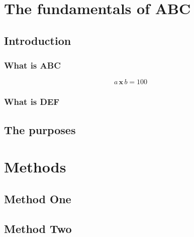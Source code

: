 \documentclass[12pt]{book}
\renewcommand{\times}{ \hspace{2pt}\textbf{x}\hspace{2pt} }
\begin{document}
\part{The fundamentals of ABC}
\chapter{Introduction}

\section{What is ABC}
\blindtext
\[ a \times b = 100 \]

\section{What is DEF}
\blindtext

\chapter{The purposes}
\blindtext



\part{Methods}
\chapter{Method One}
\blindtext
\chapter{Method Two}
\blindtext
\end{document}
